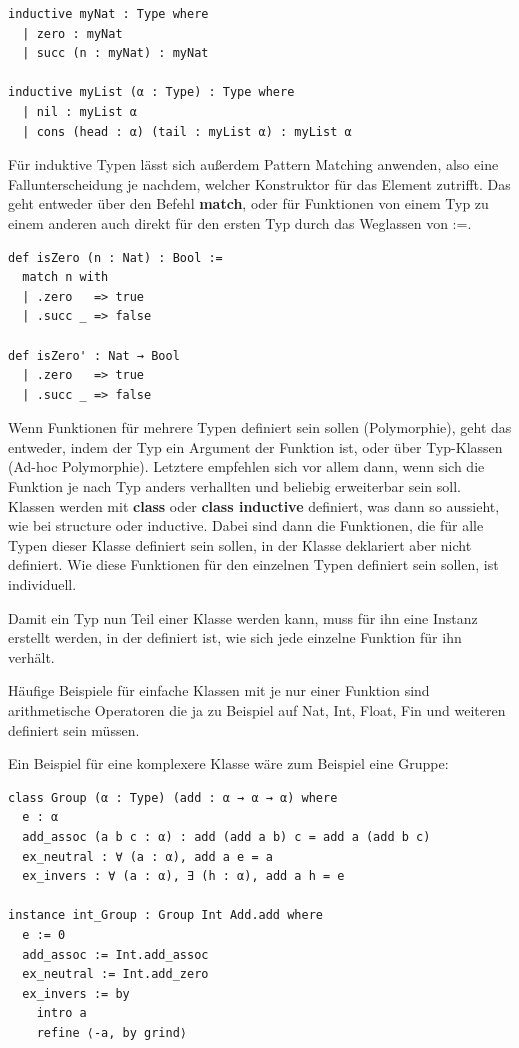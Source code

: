 \begin{lstlisting}
inductive myNat : Type where
  | zero : myNat
  | succ (n : myNat) : myNat

inductive myList (α : Type) : Type where
  | nil : myList α
  | cons (head : α) (tail : myList α) : myList α
\end{lstlisting}

Für induktive Typen lässt sich außerdem Pattern Matching anwenden, also eine Fallunterscheidung je nachdem, welcher Konstruktor für das Element zutrifft.
Das geht entweder über den Befehl \textbf{match}, oder für Funktionen von einem Typ zu einem anderen auch direkt für den ersten Typ durch das Weglassen von :=.

\begin{lstlisting}
def isZero (n : Nat) : Bool :=
  match n with
  | .zero   => true
  | .succ _ => false

def isZero' : Nat → Bool
  | .zero   => true
  | .succ _ => false
\end{lstlisting}

Wenn Funktionen für mehrere Typen definiert sein sollen (Polymorphie), geht das entweder, indem der Typ ein Argument der Funktion ist, oder über Typ-Klassen (Ad-hoc Polymorphie).
Letztere empfehlen sich vor allem dann, wenn sich die Funktion je nach Typ anders verhallten und beliebig erweiterbar sein soll.
Klassen werden mit \textbf{class} oder \textbf{class inductive} definiert, was dann so aussieht, wie bei structure oder inductive.
Dabei sind dann die Funktionen, die für alle Typen dieser Klasse definiert sein sollen, in der Klasse deklariert aber nicht definiert.
Wie diese Funktionen für den einzelnen Typen definiert sein sollen, ist individuell.

Damit ein Typ nun Teil einer Klasse werden kann, muss für ihn eine Instanz erstellt werden, in der definiert ist, wie sich jede einzelne Funktion für ihn verhält.

Häufige Beispiele für einfache Klassen mit je nur einer Funktion sind arithmetische Operatoren die ja zu Beispiel auf Nat, Int, Float, Fin und weiteren definiert sein müssen.

Ein Beispiel für eine komplexere Klasse wäre zum Beispiel eine Gruppe:

\begin{lstlisting}
class Group (α : Type) (add : α → α → α) where
  e : α
  add_assoc (a b c : α) : add (add a b) c = add a (add b c)
  ex_neutral : ∀ (a : α), add a e = a
  ex_invers : ∀ (a : α), ∃ (h : α), add a h = e

instance int_Group : Group Int Add.add where
  e := 0
  add_assoc := Int.add_assoc
  ex_neutral := Int.add_zero
  ex_invers := by
    intro a
    refine ⟨-a, by grind⟩
\end{lstlisting}

